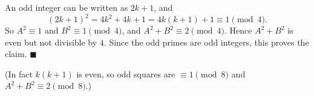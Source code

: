 An odd integer can be written as $2k+1$, and
\[(2k+1)^2=4k^2+4k+1=4k(k+1)+1\equiv1\pmod4.\]
So $A^2\equiv1$ and $B^2\equiv1\pmod4$, and $A^2+B^2\equiv2\pmod4$. Hence $A^2+B^2$ is even but not divisible by $4$. Since the odd primes are odd integers, this proves the claim. $\blacksquare$

(In fact $k(k+1)$ is even, so odd squares are $\equiv1\pmod8$ and $A^2+B^2\equiv2\pmod8$.)

